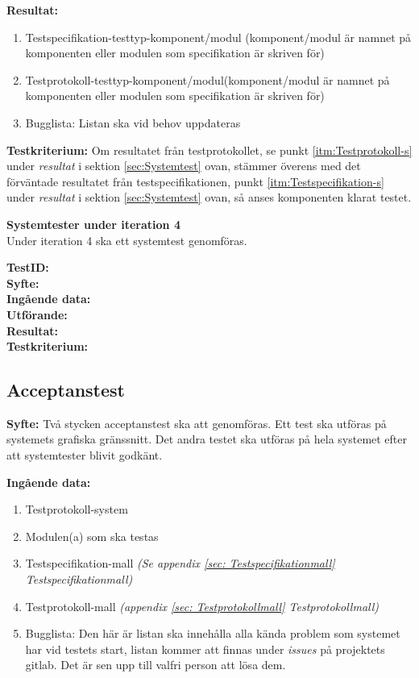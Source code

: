 \documentclass[a4paper,10pt]{article}
\begin{document}
\textbf{Resultat:}
    \begin{enumerate}
        \item \label{itm:Testspecifikation-s}
         Testspecifikation-testtyp-komponent/modul (komponent/modul är namnet på komponenten eller modulen som specifikation är skriven för)
        \item \label{itm:Testprotokoll-s} Testprotokoll-testtyp-komponent/modul(komponent/modul är namnet på komponenten eller modulen som specifikation är      		 skriven för)
        \item Bugglista: Listan ska vid behov uppdateras
    \end{enumerate}

\textbf{Testkriterium:} Om resultatet från testprotokollet, se punkt
\ref{itm:Testprotokoll-s} under \emph{resultat} i sektion \ref{sec:Systemtest}
ovan, stämmer överens med det förväntade resultatet från testspecifikationen,
punkt \ref{itm:Testspecifikation-s} under \emph{resultat} i sektion
\ref{sec:Systemtest} ovan, så anses komponenten klarat testet.

\textbf{Systemtester under iteration 4}
\\ Under iteration 4 ska ett systemtest genomföras. 

   \textbf{TestID:} 
\\ \textbf{Syfte:} 
\\ \textbf{Ingående data:} 
\\ \textbf{Utförande:} 
\\ \textbf{Resultat:}	
\\ \textbf{Testkriterium:}
  
\subsection{Acceptanstest}
\textbf{Syfte:} Två stycken acceptanstest ska att genomföras. Ett test ska utföras på systemets grafiska gränssnitt.  Det andra testet ska utföras på hela systemet efter att systemtester blivit godkänt.

\textbf{Ingående data:}
\begin{enumerate}
	\item Testprotokoll-system
    \item Modulen(a) som ska testas
    \item Testspecifikation-mall \emph{(Se appendix \ref{sec: Testspecifikationmall} Testspecifikationmall)}
    \item Testprotokoll-mall \emph{(appendix \ref{sec: Testprotokollmall} Testprotokollmall)}
    \item Bugglista: Den här är listan ska innehålla alla kända problem som systemet har vid testets start, listan kommer att finnas under
    \emph{issues} på projektets gitlab. Det är sen upp till valfri person att lösa dem.
\end{enumerate}
\end{document}
